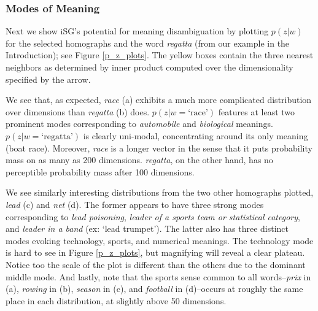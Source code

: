 \documentclass{article} %
\begin{document}
\subsubsection{Modes of Meaning}
Next we show iSG's potential for meaning disambiguation by plotting $p(z|w)$ for the selected homographs and the word \textit{regatta} (from our example in the Introduction); see Figure \ref{p_z_plots}.  The yellow boxes contain the three nearest neighbors as determined by inner product computed over the dimensionality specified by the arrow.  

We see that, as expected, \textit{race} (a) exhibits a much more complicated distribution over dimensions than \textit{regatta} (b) does.  $p(z|w=\text{`race'})$ features at least two prominent modes corresponding to \textit{automobile} and \textit{biological} meanings.  $p(z|w=\text{`regatta'})$ is clearly uni-modal, concentrating around its only meaning (boat race).  Moreover, \textit{race} is a longer vector in the sense that it puts probability mass on as many as 200 dimensions.  \textit{regatta}, on the other hand, has no perceptible probability mass after 100 dimensions. 

We see similarly interesting distributions from the two other homographs plotted, \textit{lead} (c) and \textit{net} (d).  The former appears to have three strong modes corresponding to \textit{lead poisoning}, \textit{leader of a sports team or statistical category}, and \textit{leader in a band} (ex: `lead trumpet').  The latter also has three distinct modes evoking technology, sports, and numerical meanings.  The technology mode is hard to see in Figure \ref{p_z_plots}, but magnifying will reveal a clear plateau.  Notice too the scale of the plot is different than the others due to the dominant middle mode.  And lastly, note that the sports sense common to all words--\textit{prix} in (a), \textit{rowing} in (b), \textit{season} in (c), and \textit{football} in (d)--occurs at roughly the same place in each distribution, at slightly above 50 dimensions.
\end{document}
